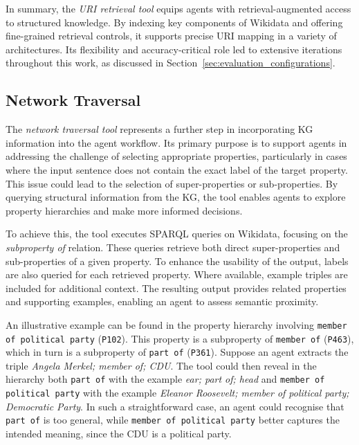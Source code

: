 \documentclass[a4paper,oneside,bibliography=totoc]{scrbook}
\begin{document}
In summary, the \textit{\ac{URI} retrieval tool} equips agents with retrieval-augmented access to structured knowledge. By indexing key components of Wikidata and offering fine-grained retrieval controls, it supports precise \ac{URI} mapping in a variety of architectures. Its flexibility and accuracy-critical role led to extensive iterations throughout this work, as discussed in Section~\ref{sec:evaluation_configurations}.

\subsection{Network Traversal}
\label{subsec:network_traversal}

The \textit{network traversal tool} represents a further step in incorporating \ac{KG} information into the agent workflow. Its primary purpose is to support agents in addressing the challenge of selecting appropriate properties, particularly in cases where the input sentence does not contain the exact label of the target property. This issue could lead to the selection of super-properties or sub-properties. By querying structural information from the \ac{KG}, the tool enables agents to explore property hierarchies and make more informed decisions.

To achieve this, the tool executes \ac{SPARQL} queries on Wikidata, focusing on the \textit{subproperty of} relation. These queries retrieve both direct super-properties and sub-properties of a given property. To enhance the usability of the output, labels are also queried for each retrieved property. Where available, example triples are included for additional context. The resulting output provides related properties and supporting examples, enabling an agent to assess semantic proximity. \pagebreak[4]

An illustrative example can be found in the property hierarchy involving \texttt{member of political party} (\texttt{P102}). This property is a subproperty of \texttt{member of} (\texttt{P463}), which in turn is a subproperty of \texttt{part of} (\texttt{P361}). Suppose an agent extracts the triple \textit{Angela Merkel; member of; CDU}. The tool could then reveal in the hierarchy both \texttt{part of} with the example \textit{ear; part of; head} and \texttt{member of political party} with the example \textit{Eleanor Roosevelt; member of political party; Democratic Party}. In such a straightforward case, an agent could recognise that \texttt{part of} is too general, while \texttt{member of political party} better captures the intended meaning, since the CDU is a political party.
\end{document}
